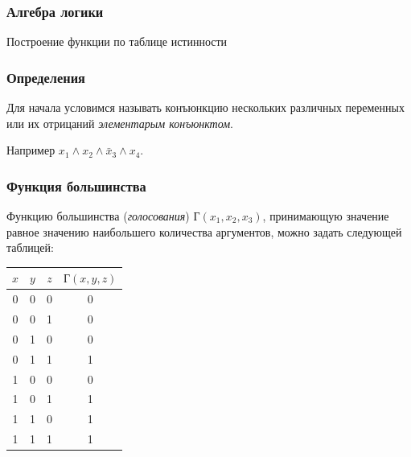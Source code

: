 \subtitle{Лекция 5 --- Алгебра логики. Часть 2}

\frame[plain]
{\titlepage}	%


\begin{frame}
\frametitle{Алгебра логики}

\begin{center}

\Huge
Построение функции по таблице истинности
	
\end{center}


\end{frame}

\begin{frame}
\frametitle{Определения}

Для начала условимся называть конъюнкцию нескольких различных переменных или их отрицаний 
\textit{элементарым конъюнктом}. 

Например $x_1\wedge x_2\wedge \bar{x}_3\wedge x_4$. 


\end{frame}

\begin{frame}
\frametitle{Функция большинства}

Функцию большинства (\textit{голосования}) $Г(x_1,x_2,x_3)$, принимающую значение равное значению наибольшего количества аргументов, можно задать следующей таблицей:

\medskip
\begin{tabular}{|c|c|c||c|}
  \hline
  $x$  & $y$ & $z$ & $Г(x,y,z)$ \\
  \hline
   0   & 0 & 0 &  0   \\
   0   & 0 & 1 &  0   \\
   0   & 1 & 0 &  0   \\
   0   & 1 & 1 &  1 \\
   1   & 0 & 0 &  0   \\
   1   & 0 & 1 &  1 \\
   1   & 1 & 0 &  1 \\
   1   & 1 & 1 &  1 \\
  \hline
\end{tabular}

\end{frame}

